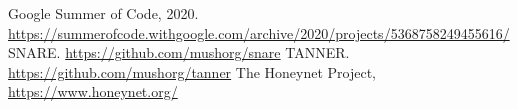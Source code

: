 \newpage
\thispagestyle{empty}
\begin{thebibliography}{00}
 Google Summer of Code, 2020. \url{https://summerofcode.withgoogle.com/archive/2020/projects/5368758249455616/}
 SNARE. \url{https://github.com/mushorg/snare}
 TANNER. \url{https://github.com/mushorg/tanner}
 The Honeynet Project, \url{https://www.honeynet.org/}
\end{thebibliography}
\vfill